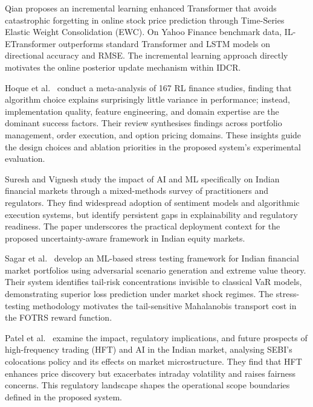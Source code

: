\documentclass[12pt,a4paper,oneside]{report}
\theoremstyle{definition}
\theoremstyle{remark}
\begin{document}
\medskip

\noindent Qian \cite{Qian2025ILTransformer} proposes an incremental learning enhanced Transformer that avoids catastrophic forgetting in online stock price prediction through Time-Series Elastic Weight Consolidation (EWC). On Yahoo Finance benchmark data, IL-ETransformer outperforms standard Transformer and LSTM models on directional accuracy and RMSE. The incremental learning approach directly motivates the online posterior update mechanism within IDCR.

\medskip

\noindent Hoque et al.\ \cite{Hoque2025RLFinanceReview} conduct a meta-analysis of 167 RL finance studies, finding that algorithm choice explains surprisingly little variance in performance; instead, implementation quality, feature engineering, and domain expertise are the dominant success factors. Their review synthesises findings across portfolio management, order execution, and option pricing domains. These insights guide the design choices and ablation priorities in the proposed system's experimental evaluation.

\medskip

\noindent Suresh and Vignesh \cite{Suresh2024AIIndianFinance} study the impact of AI and ML specifically on Indian financial markets through a mixed-methods survey of practitioners and regulators. They find widespread adoption of sentiment models and algorithmic execution systems, but identify persistent gaps in explainability and regulatory readiness. The paper underscores the practical deployment context for the proposed uncertainty-aware framework in Indian equity markets.

\medskip

\noindent Sagar et al.\ \cite{Sagar2025MLStressTesting} develop an ML-based stress testing framework for Indian financial market portfolios using adversarial scenario generation and extreme value theory. Their system identifies tail-risk concentrations invisible to classical VaR models, demonstrating superior loss prediction under market shock regimes. The stress-testing methodology motivates the tail-sensitive Mahalanobis transport cost in the FOTRS reward function.

\medskip

\noindent Patel et al.\ \cite{PatelHFTIndia} examine the impact, regulatory implications, and future prospects of high-frequency trading (HFT) and AI in the Indian market, analysing SEBI's colocations policy and its effects on market microstructure. They find that HFT enhances price discovery but exacerbates intraday volatility and raises fairness concerns. This regulatory landscape shapes the operational scope boundaries defined in the proposed system.
\end{document}
